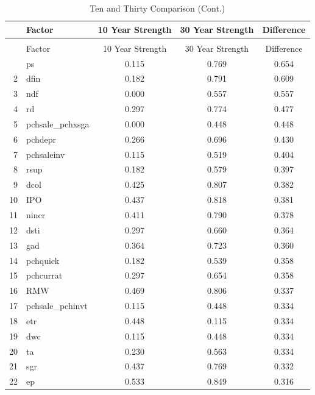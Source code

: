 \begin{footnotesize}
	\setlength{\tabcolsep}{2pt}
	\singlespacing
	\centering					
	\begin{longtable}{rl|c|c|c}
			\caption{Ten and Thirty Comparison}\label{table:ten_thirty_compare}\\
		
		\hline
		\hline
		& Factor & 10 Year Strength & 30 Year Strength & Difference \\ 
		\hline
		\endfirsthead
		
		\caption[]{Ten and Thirty Comparison (Cont.)}\\
		\hline
		\hline
		& Factor & 10 Year Strength & 30 Year Strength & Difference \\
		\hline
		\endhead
		
		\hline\hline
		\endfoot
		1 & ps & 0.115 & 0.769 & 0.654 \\ 
		2 & dfin & 0.182 & 0.791 & 0.609 \\ 
		3 & ndf & 0.000 & 0.557 & 0.557 \\ 
		4 & rd & 0.297 & 0.774 & 0.477 \\ 
		5 & pchsale\_pchxsga & 0.000 & 0.448 & 0.448 \\ 
		6 & pchdepr & 0.266 & 0.696 & 0.430 \\ 
		7 & pchsaleinv & 0.115 & 0.519 & 0.404 \\ 
		8 & rsup & 0.182 & 0.579 & 0.397 \\ 
		9 & dcol & 0.425 & 0.807 & 0.382 \\ 
		10 & IPO & 0.437 & 0.818 & 0.381 \\ 
		11 & nincr & 0.411 & 0.790 & 0.378 \\ 
		12 & dsti & 0.297 & 0.660 & 0.364 \\ 
		13 & gad & 0.364 & 0.723 & 0.360 \\ 
		14 & pchquick & 0.182 & 0.539 & 0.358 \\ 
		15 & pchcurrat & 0.297 & 0.654 & 0.358 \\ 
		16 & RMW & 0.469 & 0.806 & 0.337 \\ 
		17 & pchsale\_pchinvt & 0.115 & 0.448 & 0.334 \\ 
		18 & etr & 0.448 & 0.115 & 0.334 \\ 
		19 & dwc & 0.115 & 0.448 & 0.334 \\ 
		20 & ta & 0.230 & 0.563 & 0.334 \\ 
		21 & sgr & 0.437 & 0.769 & 0.332 \\ 
		22 & ep & 0.533 & 0.849 & 0.316 \\ 

\end{longtable}
\end{footnotesize}
